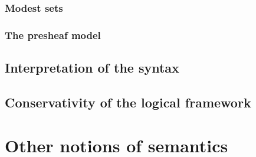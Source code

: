 \documentclass[a4paper]{article}
\begin{document}
\subsubsection{Modest sets}\label{sec:ms}
\subsubsection{The presheaf model}\label{sec:tpm}
\subsection{Interpretation of the syntax}\label{sec:iots}
\subsection{Conservativity of the logical framework}\label{sec:cotlf}
\section{Other notions of semantics}\label{sec:onos}



\end{document}
